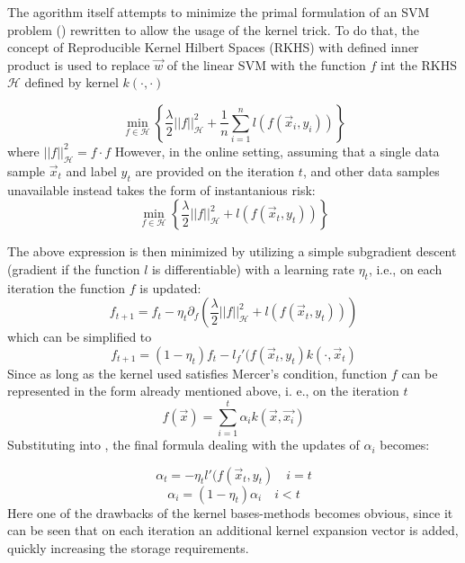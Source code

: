 The agorithm itself attempts to minimize the primal formulation of an SVM problem () rewritten to allow the usage of the kernel trick. To do that, the concept of Reproducible Kernel Hilbert Spaces (RKHS) with defined inner product is used to replace $\vec{w}$ of the linear SVM with the function $f$ int the RKHS $\mathscr{H}$  defined by kernel $k(\cdot,\cdot)$

\begin{equation}
\label{kernelPrimal}
 \min_{f \in \mathscr{H}} \left\{ \frac{\lambda}{2}||f||_\mathscr{H} ^2 +\frac{1}{n}\sum_{i=1}^{n}l(f(\vec{x}_i,y_i))\right\}
\end{equation}
where $||f||_\mathscr{H} ^2=f\cdot f$
However, in the online setting, assuming that a single data sample $\vec{x}_t$ and label $y_t$ are provided on the iteration $t$, and other data samples unavailable  instead takes the form of instantanious risk: 
\begin{equation}
\label{kernelPrimalInst}
 \min_{f \in \mathscr{H}} \left\{ \frac{\lambda}{2}||f||_\mathscr{H} ^2 +l(f(\vec{x}_t,y_t))\right\}
\end{equation}

The above expression is then minimized by utilizing a simple subgradient descent (gradient if the function $l$ is differentiable) with a learning rate $\eta_t$, i.e., on each iteration the function $f$ is updated:
\begin{equation*}
f_{t+1}=f_t-\eta_{t} \partial_f \left( \frac{\lambda}{2}||f||_\mathscr{H} ^2 +l(f(\vec{x}_t,y_t))\right) 
\end{equation*}
which can be simplified to
\begin{equation}
\label{NORMAUpdate}
f_{t+1}=(1-\eta_{t})f_t-l_f'(f(\vec{x}_t,y_t)k(\cdot,\vec{x}_t)
\end{equation}
Since as long as the kernel used satisfies Mercer's condition, function $f$ can be represented in the form already mentioned above, i. e., on the iteration $t$
\begin{equation}
\label{Fexpansion}
f(\vec{x})=\sum_{i=1}^{t}\alpha_i k(\vec{x},\vec{x_i})
\end{equation}
Substituting  into  , the final formula dealing with the updates of $\alpha_i$ becomes:

$$
\alpha_t=-\eta_{t}l'(f(\vec{x}_t,y_t) \quad {i=t}
$$
$$
\alpha_i=(1-\eta_{t})\alpha_i \quad {i<t}
$$
Here one of the drawbacks of the kernel bases-methods becomes obvious, since it can be seen that on each iteration an additional kernel expansion vector is added, quickly increasing the storage requirements.

